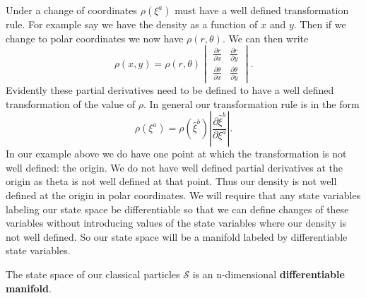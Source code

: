\documentclass{article}
\begin{document}
	Under a change of coordinates $\rho(\xi^a)$ must have a well defined transformation rule. For example say we have the density as a function of $x$ and $y$. Then if we change to polar coordinates we now have $\rho(r,\theta)$. We can then write $$\rho(x,y) = \rho(r,\theta)\begin{vmatrix}
\frac{\partial r}{\partial x} & \frac{\partial r}{\partial y} \\
\frac{\partial \theta}{\partial x} & \frac{\partial \theta}{\partial y}
\end{vmatrix}.$$ Evidently these partial derivatives need to be defined to have a well defined transformation of the value of $\rho$. In general our transformation rule is in the form $$\rho(\xi^a) = \rho(\hat{\xi}^b)\left|\frac{\partial\hat{\xi}^b}{\partial\xi^a}\right|.$$ In our example above we do have one point at which the transformation is not well defined: the origin. We do not have well defined partial derivatives at the origin as theta is not well defined at that point. Thus our density is not well defined at the origin in polar coordinates. We will require that any state variables labeling our state space be differentiable so that we can define changes of these variables without introducing values of the state variables where our density is not well defined. So our state space will be a manifold labeled by differentiable state variables.

\begin{prop}
	The state space of our classical particles $\mathcal{S}$ is an n-dimensional \textbf{differentiable manifold}.
\end{prop}

\end{document}
